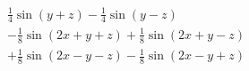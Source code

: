 \begin{eqnarray*}
\frac{1}{4}\sin(y+z)- \frac{1}{4}\sin(y-z)\\
- \frac{1}{8}\sin(2x+y+z)+ \frac{1}{8}\sin(2x+y-z)\\
+\frac{1}{8}\sin(2x-y-z)-\frac{1}{8}\sin(2x-y+z)
\end{eqnarray*}